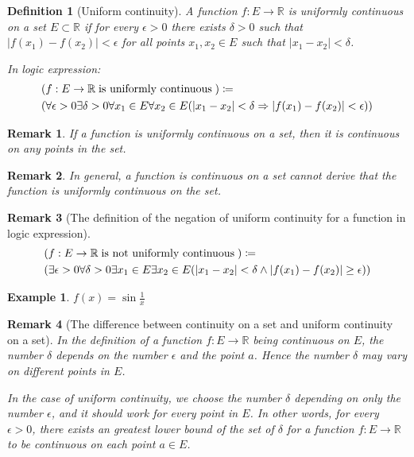\documentclass[onecolumn]{ctexart}
\newtheorem{definition}{Definition}
\newtheorem{remark}{Remark}
\newtheorem{example}{Example}
\begin{document}
\begin{definition}[Uniform continuity]
  A function $f: E \to \mathbb{R}$ is uniformly continuous on a set $E \subset 
  \mathbb{R}$ if for every $\epsilon > 0$ there exists $\delta > 0$ such that 
  $|f(x_1) - f(x_2)| < \epsilon$ for all points $x_1, x_2 \in E$ such that $|x_1 
  - x_2| < \delta$.

  In logic expression:
  \[
    \begin{split}
      &(f: E \to \mathbb{R} \thickspace \textnormal{is uniformly continuous} \thickspace) \coloneqq \\
      &(\forall \epsilon > 0 \exists \delta > 0 \forall x_1 \in E \forall x_2 \in E (|x_1 - x_2| < \delta \Rightarrow |f(x_1) - f(x_2)| < \epsilon))
    \end{split}
  \]
\end{definition}
\begin{remark}
  If a function is uniformly continuous on a set, then it is continuous on any 
  points in the set.
\end{remark}
\begin{remark}
  In general, a function is continuous on a set cannot derive that the function 
  is uniformly continuous on the set.
\end{remark}
\begin{remark}[The definition of the negation of uniform continuity for a function in logic expression]
  \[
    \begin{split}
      &(f: E \to \mathbb{R} \thickspace \textnormal{is not uniformly continuous} \thickspace) \coloneqq \\
      &(\exists \epsilon > 0 \forall \delta > 0 \exists x_1 \in E \exists x_2 \in E (|x_1 - x_2| < \delta \wedge |f(x_1) - f(x_2)| \geq \epsilon))
    \end{split}
  \] 
\end{remark}
\begin{example}
  $f(x) = \sin\frac{1}{x}$
\end{example}
\begin{remark}[The difference between continuity on a set and uniform continuity on a set]
  In the definition of a function $f: E \to \mathbb{R}$ being continuous on $E$, 
  the number $\delta$ depends on the number $\epsilon$ and the point $a$. Hence 
  the number $\delta$ may vary on different points in $E$.

  In the case of uniform continuity, we choose the number $\delta$ depending on 
  only the number $\epsilon$, and it should work for every point in $E$. In 
  other words, for every $\epsilon > 0$, there exists an greatest lower bound of 
  the set of $\delta$ for a function $f: E \to \mathbb{R}$ to be continuous on 
  each point $a \in E$.
\end{remark}
\end{document}
